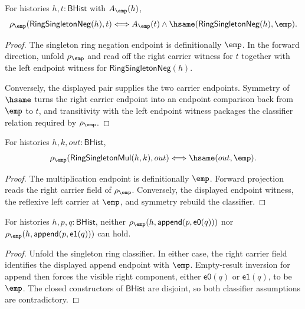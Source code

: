 \begin{theorem}
\label{thm:ring-singleton-neg-empty-endpoint}
For histories $h,t:\mathsf{BHist}$ with $A_{\emp}(h)$,
$$
\rho_{\emp}(\mathsf{RingSingletonNeg}(h),t)
\Longleftrightarrow
A_{\emp}(t)\land
\hsame(\mathsf{RingSingletonNeg}(h),\emp).
$$
\end{theorem}
\begin{proof}
The singleton ring negation endpoint is definitionally $\emp$. In the forward
direction, unfold $\rho_{\emp}$ and read off the right carrier witness for
$t$ together with the left endpoint witness for
$\mathsf{RingSingletonNeg}(h)$.

Conversely, the displayed pair supplies the two carrier endpoints. Symmetry of
$\hsame$ turns the right carrier endpoint into an endpoint comparison back
from $\emp$ to $t$, and transitivity with the left endpoint witness packages
the classifier relation required by $\rho_{\emp}$.
\end{proof}

\begin{theorem}
\label{thm:ring-singleton-classifier-mul-empty-endpoint}
For histories $h,k,out:\mathsf{BHist}$,
$$
\rho_{\emp}(\mathsf{RingSingletonMul}(h,k),out)\Longleftrightarrow
\hsame(out,\emp).
$$
\end{theorem}
\begin{proof}
The multiplication endpoint is definitionally $\emp$. Forward projection reads the
right carrier field of $\rho_{\emp}$. Conversely, the displayed endpoint witness,
the reflexive left carrier at $\emp$, and symmetry rebuild the classifier.
\end{proof}

\begin{theorem}
\label{thm:ring-singleton-classifier-append-visible-right-absurd}
For histories $h,p,q:\mathsf{BHist}$, neither
$\rho_{\emp}(h,\mathsf{append}(p,\mathsf{e0}(q)))$ nor
$\rho_{\emp}(h,\mathsf{append}(p,\mathsf{e1}(q)))$ can hold.
\end{theorem}
\begin{proof}
Unfold the singleton ring classifier. In either case, the right carrier field
identifies the displayed append endpoint with $\emp$. Empty-result inversion
for append then forces the visible right component, either $\mathsf{e0}(q)$ or
$\mathsf{e1}(q)$, to be $\emp$. The closed constructors of $\mathsf{BHist}$ are
disjoint, so both classifier assumptions are contradictory.
\end{proof}

